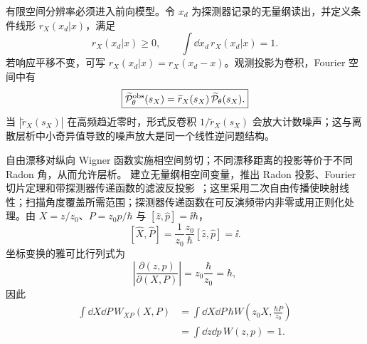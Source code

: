 \begin{exbox}[能量格与纵向相空间层析]
有限空间分辨率必须进入前向模型。令 $x_d$ 为探测器记录的无量纲读出，并定义条件线形 $r_X(x_d|x)$，满足
\begin{equation*}
r_X(x_d|x)\ge0,
\qquad
\int\dd x_d\,r_X(x_d|x)=1.
\end{equation*}
若响应平移不变，可写 $r_X(x_d|x)=r_X(x_d-x)$。观测投影为卷积，Fourier 空间中有
\begin{equation}
\boxed{
\widetilde{\mathcal P}^{\rm obs}_\theta(s_X)
=\widetilde r_X(s_X)\,
\widetilde{\mathcal P}_\theta(s_X).}
\label{eq:wigner_tomography_detector_transfer}
\end{equation}
当 $|\widetilde r_X(s_X)|$ 在高频趋近零时，形式反卷积 $1/\widetilde r_X(s_X)$ 会放大计数噪声；这与离散层析中小奇异值导致的噪声放大是同一个线性逆问题结构。

\medskip

自由漂移对纵向 Wigner 函数实施相空间剪切；不同漂移距离的投影等价于不同 Radon 角，从而允许层析。 建立无量纲相空间变量，推出 Radon 投影、Fourier 切片定理和带探测器传递函数的滤波反投影~；这里采用二次自由传播使映射线性；扫描角度覆盖所需范围；探测器传递函数在可反演频带内非零或用正则化处理。由 $X=z/z_0$、$P=z_0p/\hbar$ 与 $[\hat z,\hat p]=\ii\hbar$，
\[
[\hat X,\hat P]
=\frac1{z_0}\frac{z_0}{\hbar}[\hat z,\hat p]
=\ii.
\]
坐标变换的雅可比行列式为
\[
\left|\frac{\partial(z,p)}{\partial(X,P)}\right|
=z_0\frac{\hbar}{z_0}=\hbar,
\]
因此
\begin{align*}
\int\dd X\dd P\,W_{XP}(X,P)
&=\int\dd X\dd P\,
\hbar W\!\left(z_0X,\frac{\hbar P}{z_0}\right)\\
&=\int\dd z\dd p\,W(z,p)=1.
\end{align*}


\end{exbox}
